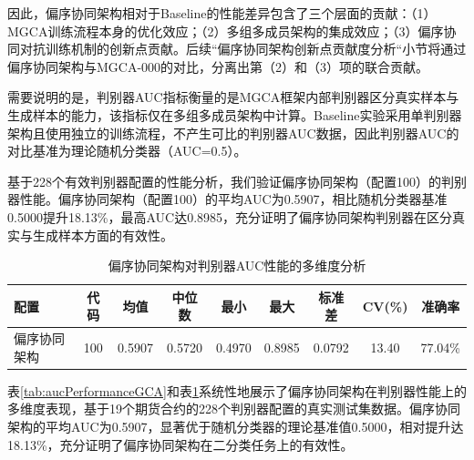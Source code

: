 因此，偏序协同架构相对于Baseline的性能差异包含了三个层面的贡献：（1）MGCA训练流程本身的优化效应；（2）多组多成员架构的集成效应；（3）偏序协同对抗训练机制的创新点贡献。后续“偏序协同架构创新点贡献度分析“小节将通过偏序协同架构与MGCA-000的对比，分离出第（2）和（3）项的联合贡献。

需要说明的是，判别器AUC指标衡量的是MGCA框架内部判别器区分真实样本与生成样本的能力，该指标仅在多组多成员架构中计算。Baseline实验采用单判别器架构且使用独立的训练流程，不产生可比的判别器AUC数据，因此判别器AUC的对比基准为理论随机分类器（AUC=0.5）。

基于228个有效判别器配置的性能分析，我们验证偏序协同架构（配置100）的判别器性能。偏序协同架构（配置100）的平均AUC为0.5907，相比随机分类器基准0.5000提升18.13\%，最高AUC达0.8985，充分证明了偏序协同架构判别器在区分真实与生成样本方面的有效性。

\begin{table}[htbp]
\centering
\caption{偏序协同架构对判别器AUC性能的影响分析}
\label{tab:aucPerformanceGCA}
\scriptsize
\setlength{\tabcolsep}{2pt}
\end{table}

\begin{table}[htbp]
\centering
\caption{偏序协同架构对判别器AUC性能的多维度分析}
\label{tab:aucPerformanceMultidimplusGCA}
\scriptsize
\setlength{\tabcolsep}{4pt}
\begin{tabular}{lcccccccc}
\toprule
\textbf{配置} & \textbf{代码} & \textbf{均值} & \textbf{中位数} & \textbf{最小} & \textbf{最大} & \textbf{标准差} & \textbf{CV(\%)} & \textbf{准确率} \\
\midrule
偏序协同架构 & 100 & 0.5907 & 0.5720 & 0.4970 & 0.8985 & 0.0792 & 13.40 & 77.04\% \\
\bottomrule
\end{tabular}
\end{table}

表\ref{tab:aucPerformanceGCA}和表\ref{tab:aucPerformanceMultidimplusGCA}系统性地展示了偏序协同架构在判别器性能上的多维度表现，基于19个期货合约的228个判别器配置的真实测试集数据。偏序协同架构的平均AUC为0.5907，显著优于随机分类器的理论基准值0.5000，相对提升达18.13\%，充分证明了偏序协同架构在二分类任务上的有效性。

